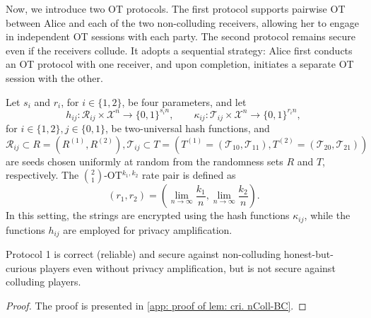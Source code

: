 \documentclass[runningheads]{llncs}
\newcommand{\parbreak}{ \vspace{0.3 em}}
\newcounter{protocol}
\begin{document}
Now, we introduce two OT protocols. The first protocol supports pairwise OT between Alice and each of the two non-colluding receivers, allowing her to engage in independent OT sessions with each party. The second protocol remains secure even if the receivers collude. It adopts a sequential strategy: Alice first conducts an OT protocol with one receiver, and upon completion, initiates a separate OT session with the other.

\parbreak Let $s_i$ and $r_i$, for $i \in \{1,2\}$, be four parameters, and let 
\[
h_{ij} : \mathcal{R}_{ij} \times \mathcal{X}^n \to \{0,1\}^{s_i n}, 
\qquad 
\kappa_{ij} : \mathcal{T}_{ij} \times \mathcal{X}^n \to \{0,1\}^{r_i n}, 
\]
for $i \in \{1,2\}, j \in \{0,1\}$, be two-universal hash functions, and $\mathcal{R}_{ij}\subset R = (R^{(1)},R^{(2)}), \mathcal{T}_{ij}\subset T= (T^{(1)}=({\mathcal{T}_{10},\mathcal{T}_{11}}),T^{(2)}=({\mathcal{T}_{20},\mathcal{T}_{21}}))$ are seeds chosen uniformly at random from the randomness sets $R$ and $T$, respectively.  
The $\binom{2}{1}$-OT$^{k_1,k_2}$ rate pair is defined as 
\[
(r_1, r_2) = \left(\lim_{n\to\infty}\frac{k_1}{n}, \lim_{n\to\infty}\frac{k_2}{n}\right).
\]  
In this setting, the strings are encrypted using the hash functions 
$\kappa_{ij}$, while the functions $h_{ij}$ are employed for privacy amplification.




\begin{lemma}\label{lem: cri. nColl-BC}
    Protocol 1 is correct (reliable) and secure against non-colluding honest-but-curious players even without privacy amplification, but is not secure against colluding players. 
\end{lemma}
\begin{proof}
    The proof is presented in \ref{app: proof of lem: cri. nColl-BC}.
\end{proof}
\parbreak
\end{document}
